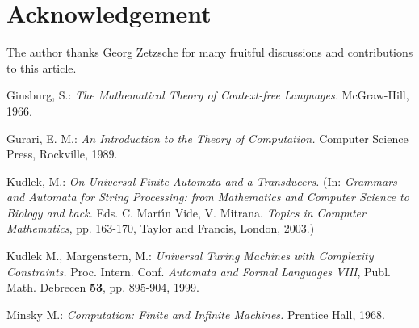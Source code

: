 \documentclass{eptcs}
\begin{document}
\section{Acknowledgement}
The author thanks Georg Zetzsche for many fruitful
discussions and contributions to this article.

\begin{thebibliography}{99}

Ginsburg, S.: {\it The Mathematical Theory of Context-free Languages.}
McGraw-Hill, 1966.

Gurari, E. M.: {\it An Introduction to the Theory of Computation.}
Computer Science Press, Rockville, 1989.

Kudlek, M.: {\it On Universal Finite Automata and a-Transducers.}
(In: {\it Grammars and Automata for String Processing: from Mathematics and Computer
Science to Biology and back.} Eds. C. Mart\'{\i}n Vide, V. Mitrana. {\it Topics
in Computer Mathematics}, pp. 163-170, Taylor and Francis, London, 2003.)

Kudlek M., Margenstern, M.: {\it Universal Turing Machines with
Complexity Constraints.} Proc. Intern. Conf. {\it Automata and Formal Languages
VIII}, Publ. Math. Debrecen {\bf 53}, pp. 895-904, 1999.

Minsky M.: {\it Computation: Finite and Infinite Machines.}
Prentice Hall, 1968.

\end{thebibliography}
\end{document}
